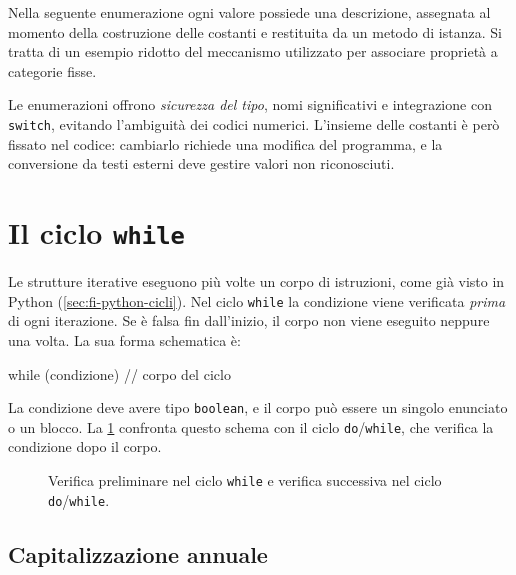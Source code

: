 \begin{example}
Nella seguente enumerazione ogni valore possiede una descrizione,
assegnata al momento della costruzione delle costanti e restituita
da un metodo di istanza. Si tratta di un esempio ridotto del
meccanismo utilizzato per associare proprietà a categorie fisse.

\end{example}

Le enumerazioni offrono \emph{sicurezza del tipo}, nomi
significativi e integrazione con \texttt{switch}, evitando
l'ambiguità dei codici numerici. L'insieme delle costanti è
però fissato nel codice: cambiarlo richiede una modifica del
programma, e la conversione da testi esterni deve gestire
valori non riconosciuti.

\section{Il ciclo \texttt{while}}
\label{sec:fi-java-cicli-while}

Le strutture iterative eseguono più volte un corpo di istruzioni,
come già visto in Python (\cref{sec:fi-python-cicli}).
Nel ciclo \texttt{while} la condizione viene verificata
\emph{prima} di ogni iterazione. Se è falsa fin dall'inizio,
il corpo non viene eseguito neppure una volta. La sua forma
schematica è:

\begin{unipdcode}[language=Java]
while (condizione) {
    // corpo del ciclo
}
\end{unipdcode}

La condizione deve avere tipo \texttt{boolean}, e il corpo può
essere un singolo enunciato o un blocco. La
\cref{fig:fi-java-cicli-controllo} confronta questo schema
con il ciclo \texttt{do}/\texttt{while}, che verifica la
condizione dopo il corpo.

\clearpage

\begin{figure}[htbp]
  \centering
  
  \caption{Verifica preliminare nel ciclo \texttt{while} e
  verifica successiva nel ciclo \texttt{do}/\texttt{while}.}
  \label{fig:fi-java-cicli-controllo}
\end{figure}

\subsection{Capitalizzazione annuale}
\label{sec:fi-java-cicli-investimento}

